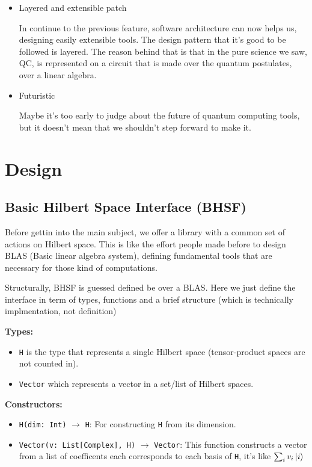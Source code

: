 \documentclass[a4paper,11pt]{article}
\def\co{\lstinline}
\begin{document}
\begin{itemize}
\item Layered and extensible patch

In continue to the previous feature, software architecture can now helps us, designing easily extensible tools. The design pattern that it's good to be followed is layered. The reason behind that is that in the pure science we saw, QC, is represented on a circuit that is made over the quantum postulates, over a linear algebra.

\item Futuristic

Maybe it's too early to judge about the future of quantum computing tools, but it doesn't mean that we shouldn't step forward to make it.

\end{itemize}

\section{Design}

\subsection{Basic Hilbert Space Interface (BHSF)}

Before gettin into the main subject, we offer a library with a common set of actions on
Hilbert space.
This is like the effort people made before to design BLAS (Basic linear algebra system),
defining fundamental tools that are necessary for those kind of computations.

Structurally, BHSF is guessed defined be over a BLAS. Here we just define the interface
in term of types, functions and a brief structure (which is technically implmentation, not definition)


\textbf{Types: }

\begin{itemize}
    \item \co|H| is the type that represents a single Hilbert space (tensor-product spaces are not counted in).
	\item \co|Vector| which represents a vector in a set/list of Hilbert spaces.
\end{itemize}

\textbf{Constructors: }

\begin{itemize}
	\item \co|H(dim: Int)| \(\to\) \co|H|: For constructing \co|H| from its dimension.
	\item \co|Vector(v: List[Complex], H)| \(\to\) \co|Vector|: This function constructs a vector from a list of coefficents each corresponds to each basis of \co|H|, it's like $\sum_i v_i \ket{i}$
\end{itemize}
\end{document}
